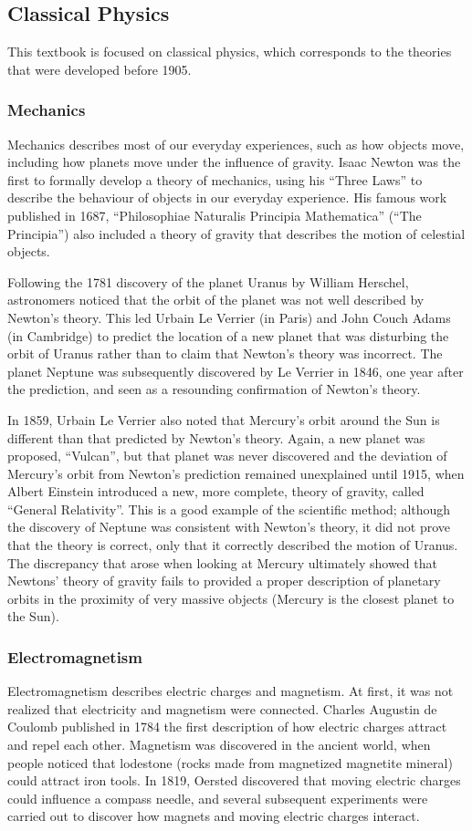 \subsection{Classical Physics}
This textbook is focused on classical physics, which corresponds to the theories that were developed before 1905.
\subsubsection{Mechanics}
Mechanics describes most of our everyday experiences, such as how objects move, including how planets move under the influence of gravity. Isaac Newton was the first to formally develop a theory of mechanics, using his ``Three Laws'' to describe the behaviour of objects in our everyday experience. His famous work published in 1687, ``Philosophiae Naturalis Principia Mathematica'' (``The Principia'') also included a theory of gravity that describes the motion of celestial objects. 

Following the 1781 discovery of the planet Uranus by William Herschel, astronomers noticed that the orbit of the planet was not well described by Newton's theory. This led Urbain Le Verrier (in Paris) and John Couch Adams (in Cambridge) to predict the location of a new planet that was disturbing the orbit of Uranus rather than to claim that Newton's theory was incorrect. The planet Neptune was subsequently discovered by Le Verrier in 1846, one year after the prediction, and seen as a resounding confirmation of Newton's theory. 

In 1859, Urbain Le Verrier also noted that Mercury's orbit around the Sun is different than that predicted by Newton's theory. Again, a new planet was proposed, ``Vulcan'', but that planet was never discovered and the deviation of Mercury's orbit from Newton's prediction remained unexplained until 1915, when Albert Einstein introduced a new, more complete, theory of gravity, called ``General Relativity''. This is a good example of the scientific method; although the discovery of Neptune was consistent with Newton's theory, it did not prove that the theory is correct, only that it correctly described the motion of Uranus. The discrepancy that arose when looking at Mercury ultimately showed that Newtons' theory of gravity fails to provided a proper description of planetary orbits in the proximity of very massive objects (Mercury is the closest planet to the Sun). 
 

\subsubsection{Electromagnetism}
Electromagnetism describes electric charges and magnetism. At first, it was not realized that electricity and magnetism were connected. Charles Augustin de Coulomb published in 1784 the first description of how electric charges attract and repel each other. Magnetism was discovered in the ancient world, when people noticed that lodestone (rocks made from magnetized magnetite mineral) could attract iron tools. In 1819, Oersted discovered that moving electric charges could influence a compass needle, and several subsequent experiments were carried out to discover how magnets and moving electric charges interact.

